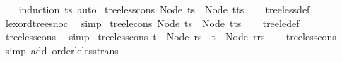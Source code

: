 \begin{isabellebody}
%
\isadelimproof
\ \ %
\endisadelimproof
%
\isatagproof
{}\isamarkupfalse%
\ {\isacharparenleft}{\kern0pt}induction\ ts{\isacharparenright}{\kern0pt}\ auto%
\endisatagproof
{\isafoldproof}%
%
\isadelimproof
\isanewline
%
\endisadelimproof
\isanewline
{}\isamarkupfalse%
\ tree{\isacharunderscore}{\kern0pt}less{\isacharunderscore}{\kern0pt}cons{\isacharcolon}{\kern0pt}\ {\isachardoublequoteopen}Node\ ts\ {\isacharless}{\kern0pt}\ Node\ {\isacharparenleft}{\kern0pt}t{\isacharhash}{\kern0pt}ts{\isacharparenright}{\kern0pt}{\isachardoublequoteclose}\isanewline
%
\isadelimproof
\ \ %
\endisadelimproof
%
\isatagproof
{}\isamarkupfalse%
\ tree{\isacharunderscore}{\kern0pt}less{\isacharunderscore}{\kern0pt}def\ \isamarkupfalse%
\ lexord{\isacharunderscore}{\kern0pt}tree{\isacharunderscore}{\kern0pt}snoc\ \isamarkupfalse%
\ simp%
\endisatagproof
{\isafoldproof}%
%
\isadelimproof
\isanewline
%
\endisadelimproof
\isanewline
{}\isamarkupfalse%
\ tree{\isacharunderscore}{\kern0pt}le{\isacharunderscore}{\kern0pt}cons{\isacharcolon}{\kern0pt}\ {\isachardoublequoteopen}Node\ ts\ {\isasymle}\ Node\ {\isacharparenleft}{\kern0pt}t{\isacharhash}{\kern0pt}ts{\isacharparenright}{\kern0pt}{\isachardoublequoteclose}\isanewline
%
\isadelimproof
\ \ %
\endisadelimproof
%
\isatagproof
{}\isamarkupfalse%
\ tree{\isacharunderscore}{\kern0pt}le{\isacharunderscore}{\kern0pt}def\ \isamarkupfalse%
\ tree{\isacharunderscore}{\kern0pt}less{\isacharunderscore}{\kern0pt}cons\ \isamarkupfalse%
\ simp%
\endisatagproof
{\isafoldproof}%
%
\isadelimproof
\isanewline
%
\endisadelimproof
\isanewline
{}\isamarkupfalse%
\ tree{\isacharunderscore}{\kern0pt}less{\isacharunderscore}{\kern0pt}cons{\isacharprime}{\kern0pt}{\isacharcolon}{\kern0pt}\ {\isachardoublequoteopen}t\ {\isasymle}\ Node\ rs\ {\isasymLongrightarrow}\ t\ {\isacharless}{\kern0pt}\ Node\ {\isacharparenleft}{\kern0pt}r{\isacharhash}{\kern0pt}rs{\isacharparenright}{\kern0pt}{\isachardoublequoteclose}\isanewline
%
\isadelimproof
\ \ %
\endisadelimproof
%
\isatagproof
{}\isamarkupfalse%
\ tree{\isacharunderscore}{\kern0pt}less{\isacharunderscore}{\kern0pt}cons\ \isamarkupfalse%
\ {\isacharparenleft}{\kern0pt}simp\ add{\isacharcolon}{\kern0pt}\ order{\isacharunderscore}{\kern0pt}le{\isacharunderscore}{\kern0pt}less{\isacharunderscore}{\kern0pt}trans{\isacharparenright}{\kern0pt}%
\endisatagproof
{\isafoldproof}%
%
\isadelimproof
\isanewline
%
\endisadelimproof

\end{isabellebody}
